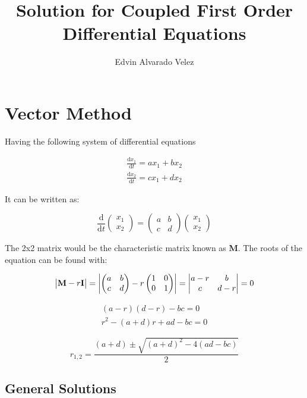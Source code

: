 \documentclass[12pt,letterpaper]{article}
\author{Edvin Alvarado Velez}
\title{Solution for Coupled First Order Differential Equations}
\newcommand{\vectors}[2]{
	\begin{pmatrix}
		#1 \\ #2
	\end{pmatrix}
}
\newcommand{\smatrix}[4]{
	\begin{pmatrix}
		#1 & #2 \\ #3 & #4
	\end{pmatrix}
}
\newcommand{\dmatrix}[4]{
	\begin{vmatrix}
		#1 & #2 \\ #3 & #4
	\end{vmatrix}
}
\begin{document}
	\maketitle
	
	\clearpage
		

	\section{Vector Method}

		Having the following system of differential equations

		\begin{align*}
			\frac{\mathrm{d}x_1}{\mathrm{d}t} = a x_1 + b x_2 \\
			\frac{\mathrm{d}x_2}{\mathrm{d}t} = c x_1 + d x_2 
		\end{align*}

		It can be written as:

		\begin{equation}
			\frac{\mathrm{d}}{\mathrm{d}t} \vectors{x_1}{x_2} = \smatrix{a}{b}{c}{d} \vectors{x_1}{x_2}
		\end{equation}
		\label{og}

		The 2x2 matrix would be the characteristic matrix known as \textbf{M}. The roots of the equation can be found with:

		\begin{equation}
			\begin{vmatrix}	\text{\textbf{M}}-r \text{\textbf{I}} \end{vmatrix} = \left| \smatrix{a}{b}{c}{d} - r \smatrix{1}{0}{0}{1} \right| = \dmatrix{a-r}{b}{c}{d-r} = 0
		\end{equation}
		\label{characteristic matrix}

		\begin{align*}
			(a-r)(d-r) - bc = 0 \\
			r^2 -(a+d)r + ad -bc = 0 
		\end{align*}

		\begin{equation}
			r_{1,2} = \frac{(a+d) \pm \sqrt{(a+d)^2-4(ad-bc)}}{2}
		\end{equation}
		\label{roots}

		\subsection{General Solutions}
\end{document}
